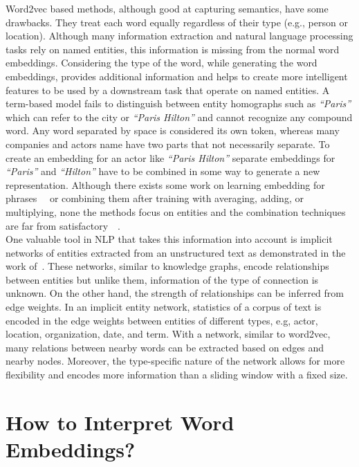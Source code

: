 Word2vec based methods, although good at capturing semantics, have some drawbacks. They treat each word equally regardless of their type (e.g., person or location). Although many information extraction and natural language processing tasks rely on named entities, this information is missing from the normal word embeddings. Considering the type of the word, while generating the word embeddings, provides additional information and helps to create more intelligent features to be used by a downstream task that operate on named entities. A term-based model fails to distinguish between entity homographs such as  \emph{``Paris''}  which can refer to the city or \emph{``Paris Hilton''} and cannot recognize any compound word. Any word separated by space is considered its own token, whereas many companies and actors name have two parts that not necessarily separate. To create an embedding for an actor like \emph{``Paris Hilton''} separate embeddings for \emph{``Paris''} and \emph{``Hilton''} have to be combined in some way to generate a new representation. Although there exists some work on learning embedding for phrases~~ or combining them after training with averaging, adding, or multiplying, none the methods focus on entities and the combination techniques are far from satisfactory~~.  \\
One valuable tool in NLP that takes this information into account is implicit networks of entities extracted from an unstructured text as demonstrated in the work of~. These networks, similar to knowledge graphs, encode relationships between entities but unlike them, information of the type of connection is unknown. On the other hand, the strength of relationships can be inferred from edge weights. In an implicit entity network, statistics of a corpus of text is encoded in the edge weights between entities of different types, e.g, actor, location, organization, date, and term. With a network, similar to word2vec, many relations between nearby words can be extracted based on edges and nearby nodes. Moreover, the type-specific nature of the network allows for more flexibility and encodes more information than a sliding window with a fixed size. 

 \section{How to Interpret Word Embeddings? }

